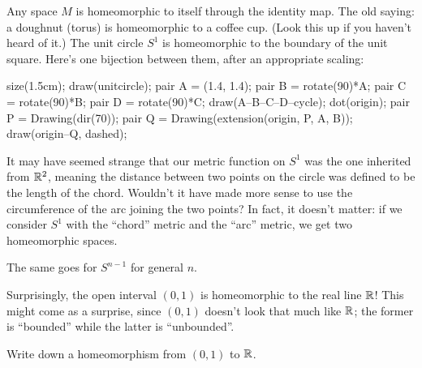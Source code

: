 \begin{example}
	\listhack
	\begin{enumerate}[(a)]
		\ii Any space $M$ is homeomorphic to itself
		through the identity map.
		\ii The old saying: a doughnut (torus) is
		homeomorphic to a coffee cup.
		(Look this up if you haven't heard of it.)
		\ii The unit circle $S^1$ is homeomorphic
		to the boundary of the unit square.
		Here's one bijection between them, after an appropriate scaling:
		\begin{center}
			\begin{asy}
				size(1.5cm);
				draw(unitcircle);
				pair A = (1.4, 1.4);
				pair B = rotate(90)*A;
				pair C = rotate(90)*B;
				pair D = rotate(90)*C;
				draw(A--B--C--D--cycle);
				dot(origin);
				pair P = Drawing(dir(70));
				pair Q = Drawing(extension(origin, P, A, B));
				draw(origin--Q, dashed);
			\end{asy}
		\end{center}
	\end{enumerate}
\end{example}
\begin{example}
	It may have seemed strange that our metric function on $S^1$
	was the one inherited from $\mathbb R^2$, meaning the distance between two points
	on the circle was defined to be the length of the chord.
	Wouldn't it have made more sense to use the circumference of the arc joining
	the two points?
	In fact, it doesn't matter: if we consider $S^1$ with the ``chord'' metric
	and the ``arc'' metric, we get two homeomorphic spaces.

	The same goes for $S^{n-1}$ for general $n$.
\end{example}

\begin{example}
	Surprisingly, the open interval $(0,1)$ is homeomorphic to the real line $\mathbb R$!
	This might come as a surprise, since $(0,1)$ doesn't look that much like $\mathbb R$;
	the former is ``bounded'' while the latter is ``unbounded''.
\end{example}
\begin{exercise}
	Write down a homeomorphism from $(0,1)$ to $\mathbb R$.
\end{exercise}

